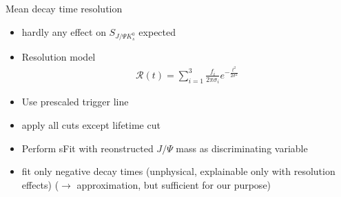 \documentclass{beamer}
\newcommand{\SJPsi}{S_{J/\Psi K_s^0}}
\begin{document}
	\begin{frame}{Mean decay time resolution}
	\begin{itemize}
    \item hardly any effect on $\SJPsi$ expected
	\item Resolution model
	\begin{align}
	\mathcal{R}(t) = \sum_{i=1}^3 \frac{f_i}{2\pi\sigma_i}e^{-\tfrac{t^2}{2\sigma^2}}
	\end{align}
	\item Use prescaled trigger line
	\item apply all cuts except lifetime cut
	\item Perform sFit with reonstructed $J/\Psi$ mass as discriminating variable
	\item fit only negative decay times (unphysical, explainable only with resolution effects) ($\rightarrow$ approximation, but sufficient for our purpose)
	\end{itemize}
	\end{frame}
	
\end{document}
